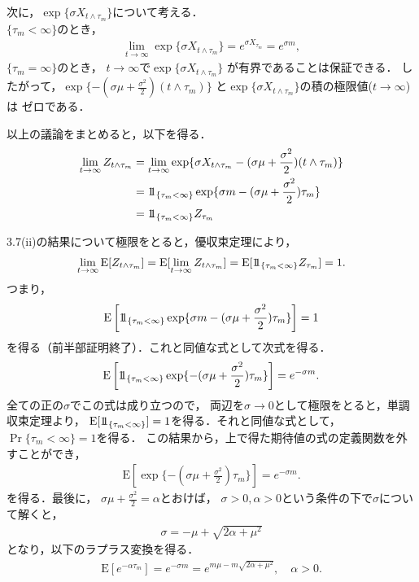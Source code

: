 \documentclass[a4paper,11pt]{jsarticle}
\newcommand{\E}{\mathrm{E}}
\newcommand{\1}{\mbox{1}\hspace{-0.30em}\mbox{1}}
\begin{document}
次に，$\exp\{\sigma X_{t\wedge\tau_m}\}$について考える．\\
$\{\tau_m<\infty\}$のとき，
\begin{align*}
  \lim_{t\to\infty}
  \exp\{\sigma X_{t\wedge\tau_m}\}
  = e^{\sigma X_{\tau_m}}=e^{\sigma m},
\end{align*}
$\{\tau_m=\infty\}$のとき，
$t\to\infty$で$\exp\{\sigma X_{t\wedge\tau_m}\}$
が有界であることは保証できる．
したがって，$\exp\{-(\sigma\mu+\frac{\sigma^2}{2})(t\wedge\tau_m)\}$
と$\exp\{\sigma X_{t\wedge\tau_m}\}$の積の極限値($t\to\infty$)は
ゼロである．

以上の議論をまとめると，以下を得る．
\begin{align*}
  \begin{split}
    \lim_{t\to\infty} Z_{t\wedge\tau_m}
    &=\lim_{t\to\infty}
    \exp\{ \sigma X_{t\wedge\tau_m}
    -(\sigma\mu+\frac{\sigma^2}{2})(t\wedge\tau_m) \} \\
    &=\1_{\{\tau_m<\infty\}} \exp\{ \sigma m
    -(\sigma\mu+\frac{\sigma^2}{2})\tau_m \} \\
    &=\1_{\{\tau_m<\infty\}}Z_{\tau_m}
  \end{split}
\end{align*}

3.7(ii)の結果について極限をとると，優収束定理により，
\begin{align*}
  \lim_{t\to\infty}\E[Z_{t\wedge\tau_m}]
  =\E[\lim_{t\to\infty}Z_{t\wedge\tau_m}]
  =\E[\1_{\{\tau_m<\infty\}}Z_{\tau_m}]
  =1.
\end{align*}
つまり，
\begin{align*}
  \E\left[\1_{\{\tau_m<\infty\}} \exp\{ \sigma m
  -(\sigma\mu+\frac{\sigma^2}{2})\tau_m \} \right]=1
\end{align*}
を得る（前半部証明終了）．これと同値な式として次式を得る．
\begin{align*}
  \E\left[\1_{\{\tau_m<\infty\}}
  \exp\{-(\sigma\mu+\frac{\sigma^2}{2})\tau_m\}\right]
  =e^{-\sigma m}.
\end{align*}
全ての正の$\sigma$でこの式は成り立つので，
両辺を$\sigma\to0$として極限をとると，単調収束定理より，
$\E[\1_{\{\tau_m<\infty\}}]=1$を得る．それと同値な式として，
$\Pr\{\tau_m<\infty\}=1$を得る．
この結果から，上で得た期待値の式の定義関数を外すことができ，
\begin{align*}
  \E\left[\exp\{-(\sigma\mu+\frac{\sigma^2}{2})\tau_m\}\right]
  =e^{-\sigma m}.
\end{align*}
を得る．最後に，
$\sigma\mu+\frac{\sigma^2}{2}=\alpha$とおけば，
$\sigma>0,\alpha>0$という条件の下で$\sigma$について解くと，
\begin{align*}
  \sigma=-\mu+\sqrt{2\alpha+\mu^2}
\end{align*}
となり，以下のラプラス変換を得る．
\begin{align*}
  \E[e^{-\alpha\tau_m}]=e^{-\sigma m}
  =e^{m\mu-m\sqrt{2\alpha+\mu^2}}, \quad \alpha>0.
\end{align*}
\end{document}
